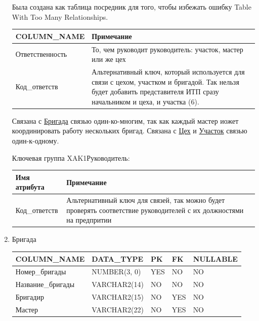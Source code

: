 \begin{enumerate}
\begin{tabular}{|p{7cm}|p{3cm}|p{1cm}|p{1cm}|p{3cm}|}
    \end{tabular}

    Была создана как таблица посредник для того, чтобы избежать ошибку Table With Too Many Relationships.

    \begin{tabular}{|p{7cm}|p{9.3cm}|} \hline

        {\bf COLUMN\_NAME} & {\bf Примечание} \\ \hline
        Ответственность & То, чем руководит руководитель: участок, мастер или же цех  \\ \hline
        Код\_ответств & Альтернативный ключ, который используется для связи с цехом, участком и бригадой. Так нельзя будет добавить представителя ИТП сразу начальником и цеха, и участка (6). \\ \hline
    \end{tabular}

    Связана с \underline{Бригада} связью один-ко-многим, так как каждый мастер иожет координировать работу нескольких бригад.
    Связана с \underline{Цех} и \underline{Участок} связью один-к-одному.

    Ключевая группа XAK1Руководитель:

    \begin{tabular}{|p{7cm}|p{9.3cm}|} \hline

        {\bf Имя атрибута} & {\bf Примечание} \\ \hline
        Код\_ответств & Альтернативный ключ для связей, так можно будет проверять соответствие руководителей с их должностями на предпритии \\ \hline

    \end{tabular}

    \item{Бригада}

    \begin{tabular}{|p{7cm}|p{3cm}|p{1cm}|p{1cm}|p{3cm}|} \hline

        {\bf COLUMN\_NAME} & {\bf DATA\_TYPE} & {\bf PK} & {\bf FK} & {\bf NULLABLE} \\ \hline
        Номер\_бригады & NUMBER(3, 0) & YES & NO & NO \\ \hline
        Название\_бригады & VARCHAR2(14) & NO & NO & NO \\ \hline
        Бригадир & VARCHAR2(15) & NO & YES & NO \\ \hline
        Мастер & VARCHAR2(22) & NO & YES & NO \\ \hline


\end{tabular}
\end{enumerate}
